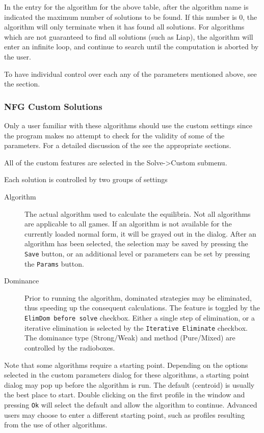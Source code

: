 In the entry for the algorithm for the above table, after the algorithm name is 
indicated the maximum number of solutions 
to be found.  If this number is 0, the algorithm will only terminate when it has found 
all solutions.  For algorithms which are not guaranteed to find all solutions (such 
as Liap), the 
algorithm will enter an infinite loop, and continue to search until the computation is 
aborted by the user. 
 
To have individual control over each any of the parameters mentioned above, see
the  section.

\subsubsection{NFG Custom Solutions}\label{NFGCustomSolutions}
Only a user familiar with these algorithms should use the custom settings
since the program makes no attempt to check for the validity of some of
the parameters.  For a detailed discussion of the 
 see the appropriate sections.

All of the custom features are selected in the Solve->Custom submenu.  

Each solution is controlled by two groups of settings
\begin{description}
\item[Algorithm] The actual algorithm used to calculate the equilibria.  Not all algorithms
are applicable to all games.  If an algorithm is not available for the
currently loaded normal form, it will be grayed out in the dialog.  After an
algorithm has been selected, the selection may be saved by pressing 
the {\tt Save} button, or an additional level or parameters can be set by
pressing the {\tt Params} button.
\item[Dominance] Prior to running the algorithm, dominated strategies may be eliminated, thus
speeding up the consequent calculations.  The feature is toggled by 
the {\tt ElimDom before solve} checkbox.  Either a single step of elimination,
or a iterative elimination is selected by the {\tt Iterative Eliminate} 
checkbox.  The dominance type (Strong/Weak) and method (Pure/Mixed) are
 controlled by the radioboxes.
\end{description}

Note that some algorithms require a starting point.  Depending on the
options selected in the custom parameters dialog for these algorithms,
a starting point dialog may pop up before the algorithm is run.  The
default (centroid) is usually the best place to start.  Double clicking on
the first profile in the window and pressing {\tt Ok} will select the
default and allow the algorithm to continue. Advanced users may choose to
enter a different starting point, such as profiles resulting from the use of other 
algorithms.  

